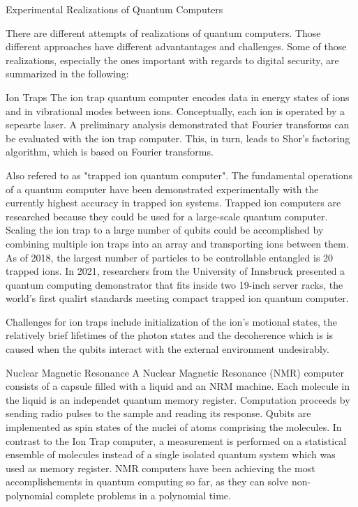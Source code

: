 \documentclass[aps,twocolumn,preprintnumbers]{revtex4}
\begin{document}
\begin{section}{Experimental Realizations of Quantum Computers}

There are different attempts of realizations of quantum computers.
Those different approaches have different advantantages and challenges. 
Some of those realizations, especially the ones important with regards to digital security, 
are summarized in the following:

\begin{subsection}{Ion Traps}
The ion trap quantum computer encodes data in energy states of ions and in vibrational modes between ions. 
Conceptually, each ion is operated by a sepearte laser. 
A preliminary analysis demonstrated that Fourier transforms can be evaluated with the ion trap computer. 
This, in turn, leads to Shor's factoring algorithm, 
which is based on Fourier transforms.

Also refered to as "trapped ion quantum computer". 
The fundamental operations of a quantum computer have been demonstrated experimentally with the currently highest accuracy in trapped ion systems. 
Trapped ion computers are researched because they could be used for a large-scale quantum computer.
Scaling the ion trap to a large number of qubits could be accomplished by combining multiple ion traps into an array and transporting ions between them. 
As of 2018, the largest number of particles to be controllable entangled is 20 trapped ions. 
In 2021, researchers from the University of Innsbruck presented a quantum computing demonstrator that fits inside two 19-inch server racks, 
the world's first qualirt standards meeting compact trapped ion quantum computer. 

Challenges for ion traps include initialization of the ion's motional states, 
the relatively brief lifetimes of the photon states and the decoherence which is is caused when the qubits interact with the external environment undesirably.
\end{subsection}

\begin{subsection}{Nuclear Magnetic Resonance}
A Nuclear Magnetic Resonance (NMR) computer consists of a capsule filled with a liquid and an NRM machine. 
Each molecule in the liquid is an independet quantum memory register. 
Computation proceeds by sending radio pulses to the sample and reading its response. 
Qubits are implemented as spin states of the nuclei of atoms comprising the molecules. 
In contrast to the Ion Trap computer, 
a measurement is performed on a statistical ensemble of molecules instead of a single isolated quantum system which was used as memory register. 
NMR computers have been achieving the most accomplishements in quantum computing so far, 
as they can solve non-polynomial complete problems in a polynomial time.


\end{subsection}
\end{section}
\end{document}
